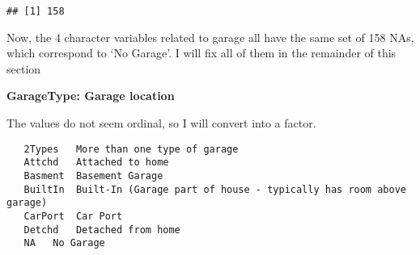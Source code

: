 \documentclass[]{article}
\newenvironment{Shaded}{\begin{snugshade}}{\end{snugshade}}
\newcommand{\KeywordTok}[1]{\textcolor[rgb]{0.13,0.29,0.53}{\textbf{#1}}}
\newcommand{\DecValTok}[1]{\textcolor[rgb]{0.00,0.00,0.81}{#1}}
\newcommand{\StringTok}[1]{\textcolor[rgb]{0.31,0.60,0.02}{#1}}
\newcommand{\CommentTok}[1]{\textcolor[rgb]{0.56,0.35,0.01}{\textit{#1}}}
\newcommand{\OtherTok}[1]{\textcolor[rgb]{0.56,0.35,0.01}{#1}}
\newcommand{\OperatorTok}[1]{\textcolor[rgb]{0.81,0.36,0.00}{\textbf{#1}}}
\newcommand{\NormalTok}[1]{#1}
\begin{document}
\begin{Shaded}
\end{Shaded}

\begin{verbatim}
## [1] 158
\end{verbatim}

Now, the 4 character variables related to garage all have the same set
of 158 NAs, which correspond to `No Garage'. I will fix all of them in
the remainder of this section

\textbf{GarageType: Garage location}

The values do not seem ordinal, so I will convert into a factor.

\begin{verbatim}
   2Types   More than one type of garage
   Attchd   Attached to home
   Basment  Basement Garage
   BuiltIn  Built-In (Garage part of house - typically has room above garage)
   CarPort  Car Port
   Detchd   Detached from home
   NA   No Garage
\end{verbatim}

\begin{Shaded}
\end{Shaded}
\end{document}
